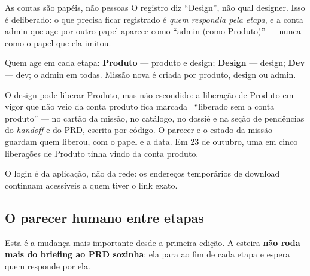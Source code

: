 \documentclass[11pt,a4paper]{article}
\newcommand{\cod}[1]{{\ttfamily\small #1}}
\newcommand{\bolinha}[1]{\tikz[baseline=-0.5ex]{\fill[#1] (0,0) circle (0.33em);}}
\newcommand{\statusAmbar}{\bolinha{sinalAmbar}}
\begin{document}
\begin{caixaNorma}{As contas são papéis, não pessoas}
O registro diz ``Design'', não qual designer. Isso é deliberado: o que precisa ficar registrado é \emph{quem respondia pela etapa}, e a conta \cod{admin} que age por outro papel aparece como ``admin (como Produto)'' --- nunca como o papel que ela imitou.

Quem age em cada etapa: \textbf{Produto} --- \cod{produto} e \cod{design}; \textbf{Design} --- \cod{design}; \textbf{Dev} --- \cod{dev}; o \cod{admin} em todas. Missão nova é criada por \cod{produto}, \cod{design} ou \cod{admin}.

O \cod{design} pode liberar Produto, mas não escondido: a liberação de Produto em vigor que não veio da conta \cod{produto} fica marcada \statusAmbar\ ``liberado sem a conta produto'' --- no cartão da missão, no catálogo, no dossiê e na seção de pendências do \emph{handoff} e do PRD, escrita por código. O parecer e o estado da missão guardam quem liberou, com o papel e a data. Em 23 de outubro, uma em cinco liberações de Produto tinha vindo da conta \cod{produto}.

O login é da aplicação, não da rede: os endereços temporários de download continuam acessíveis a quem tiver o link exato.
\end{caixaNorma}

\subsection{O parecer humano entre etapas}
\label{sec:passagem}

Esta é a mudança mais importante desde a primeira edição. A esteira \textbf{não roda mais do briefing ao PRD sozinha}: ela para ao fim de cada etapa e espera quem responde por ela.
\end{document}
